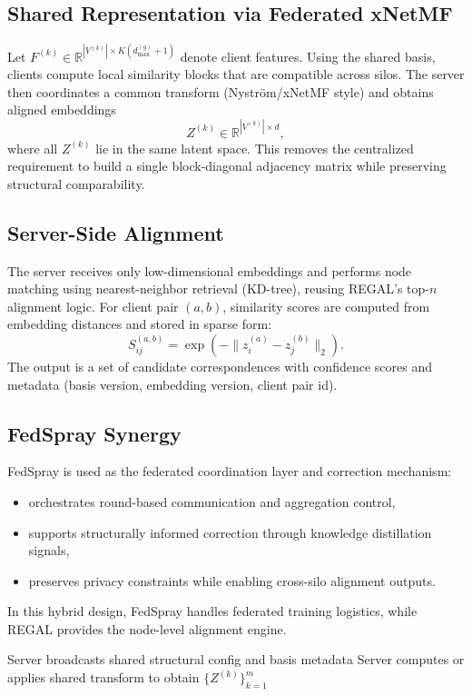\subsection{Shared Representation via Federated xNetMF}
Let $F^{(k)} \in \mathbb{R}^{|V^{(k)}| \times K(d_{\max}^{(g)}+1)}$ denote client features. Using the shared basis, clients compute local similarity blocks that are compatible across silos. The server then coordinates a common transform (Nystr\"om/xNetMF style) and obtains aligned embeddings
\[
Z^{(k)} \in \mathbb{R}^{|V^{(k)}| \times d},
\]
where all $Z^{(k)}$ lie in the same latent space. This removes the centralized requirement to build a single block-diagonal adjacency matrix while preserving structural comparability.

\subsection{Server-Side Alignment}
The server receives only low-dimensional embeddings and performs node matching using nearest-neighbor retrieval (KD-tree), reusing REGAL's top-$n$ alignment logic. For client pair $(a,b)$, similarity scores are computed from embedding distances and stored in sparse form:
\[
S_{ij}^{(a,b)} = \exp(-\|z_i^{(a)} - z_j^{(b)}\|_2).
\]
The output is a set of candidate correspondences with confidence scores and metadata (basis version, embedding version, client pair id).

\subsection{FedSpray Synergy}
FedSpray is used as the federated coordination layer and correction mechanism:
\begin{itemize}[leftmargin=*]
    \item orchestrates round-based communication and aggregation control,
    \item supports structurally informed correction through knowledge distillation signals,
    \item preserves privacy constraints while enabling cross-silo alignment outputs.
\end{itemize}
In this hybrid design, FedSpray handles federated training logistics, while REGAL provides the node-level alignment engine.

\begin{algorithm}[htbp]
\caption{F-REGAL Federated Alignment Protocol}
Server broadcasts shared structural config and basis metadata\;
Server computes or applies shared transform to obtain $\{Z^{(k)}\}_{k=1}^m$\;
\end{algorithm}

